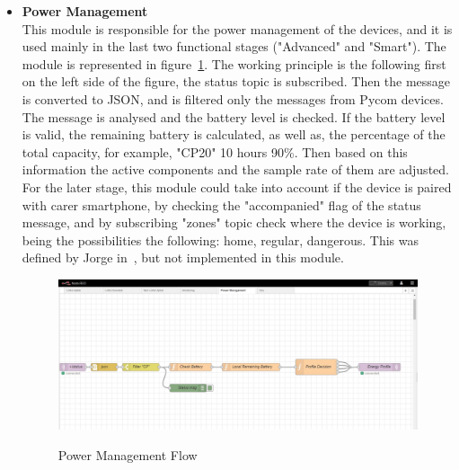 \begin{itemize}
   \item \textbf{Power Management}\\
   This module is  responsible for the power management of the devices, and it is used mainly in the last two functional stages ("Advanced"  and "Smart"). The module is represented in  figure~\ref{fig:Power_Management}. The working principle is the following first on the left side of the figure, the status topic is subscribed. Then the message is converted to JSON, and is filtered only the messages from Pycom devices. The message is analysed and the battery level is checked. If the battery level is valid, the remaining battery is calculated, as well as, the percentage of the total capacity, for example, "CP20" 10 hours 90\%. Then based on this information the active components and the sample rate of them are adjusted. For the later stage, this module could take into account if the device is paired  with carer smartphone, by checking the "accompanied" flag of the status message, and by subscribing "zones" topic check where the device is working, being the possibilities the following: home, regular, dangerous. This was defined by Jorge in~\cite{githuMQTT}, but not implemented in this module.
    \begin{figure}[htbp]
      \centering
      
        {\includegraphics[width=0.9\linewidth]{Chapters/Figures/PowerManagement.JPG}}
     
      \caption{Power Management Flow}
      \label{fig:Power_Management}
    \end{figure}
 
\end{itemize}

